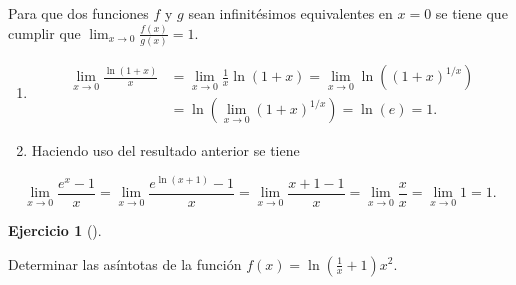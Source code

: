 \documentclass[
  spanish,
  a4paper,
]{scrreport}
\theoremstyle{definition}
\newtheorem{exercise}{Ejercicio}[chapter]
\theoremstyle{remark}
\begin{document}
\begin{tcolorbox}[enhanced jigsaw, arc=.35mm, bottomrule=.15mm, bottomtitle=1mm, breakable, colback=white, colbacktitle=quarto-callout-tip-color!10!white, colframe=quarto-callout-tip-color-frame, coltitle=black, left=2mm, leftrule=.75mm, opacityback=0, opacitybacktitle=0.6, rightrule=.15mm, title=\textcolor{quarto-callout-tip-color}{\faLightbulb}\hspace{0.5em}{Solución}, titlerule=0mm, toprule=.15mm, toptitle=1mm]

Para que dos funciones \(f\) y \(g\) sean infinitésimos equivalentes en
\(x=0\) se tiene que cumplir que \(\lim_{x\to 0}\frac{f(x)}{g(x)}=1\).

\begin{enumerate}
\def\labelenumi{\alph{enumi}.}
\item
  \begin{align*}
  \lim_{x\to 0}\frac{\ln(1+x)}{x} &= \lim_{x\to 0}\frac{1}{x}\ln(1+x) = \lim_{x\to 0}\ln\left((1+x)^{1/x}\right)\\  
  &= \ln\left(\lim_{x\to 0} (1+x)^{1/x}\right) = \ln(e) = 1.
  \end{align*}
\item
  Haciendo uso del resultado anterior se tiene
\end{enumerate}

\[\lim_{x\to 0}\frac{e^x-1}{x} = \lim_{x\to 0}\frac{e^{\ln(x+1)}-1}{x} = \lim_{x\to 0}\frac{x+1-1}{x} = \lim_{x\to 0} \frac{x}{x} = \lim_{x\to 0} 1 = 1.\]

\end{tcolorbox}

\begin{exercise}[]\protect\hypertarget{exr-6}{}\label{exr-6}

Determinar las asíntotas de la función
\(f(x)=\ln\left(\frac{1}{x}+1\right)x^2\).

\end{exercise}
\end{document}
